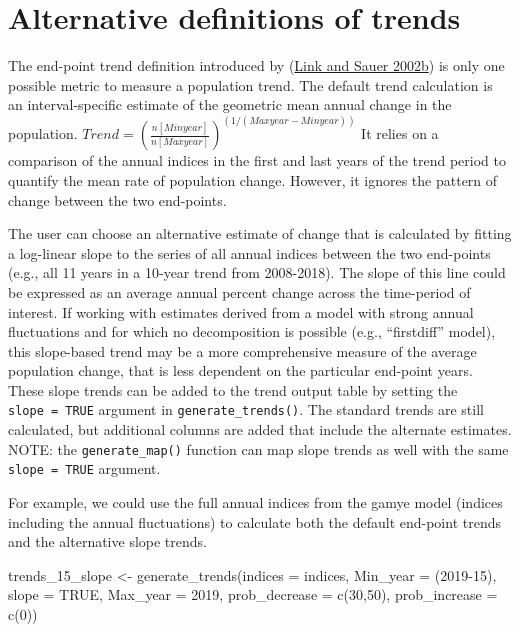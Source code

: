 \documentclass[
]{book}
\newenvironment{Shaded}{\begin{snugshade}}{\end{snugshade}}
\newcommand{\AttributeTok}[1]{\textcolor[rgb]{0.77,0.63,0.00}{#1}}
\newcommand{\ConstantTok}[1]{\textcolor[rgb]{0.00,0.00,0.00}{#1}}
\newcommand{\DecValTok}[1]{\textcolor[rgb]{0.00,0.00,0.81}{#1}}
\newcommand{\FunctionTok}[1]{\textcolor[rgb]{0.00,0.00,0.00}{#1}}
\newcommand{\NormalTok}[1]{#1}
\newcommand{\OtherTok}[1]{\textcolor[rgb]{0.56,0.35,0.01}{#1}}
\begin{document}
\hypertarget{alternative-definitions-of-trends}{%
\section{Alternative definitions of trends}\label{alternative-definitions-of-trends}}

The end-point trend definition introduced by (\protect\hyperlink{ref-link2002a}{Link and Sauer 2002b}) is only one possible metric to measure a population trend. The default trend calculation is an interval-specific estimate of the geometric mean annual change in the population. \(Trend = (\frac {n[Minyear]}{n[Maxyear]})^{(1/(Maxyear-Minyear))}\) It relies on a comparison of the annual indices in the first and last years of the trend period to quantify the mean rate of population change. However, it ignores the pattern of change between the two end-points.

The user can choose an alternative estimate of change that is calculated by fitting a log-linear slope to the series of all annual indices between the two end-points (e.g., all 11 years in a 10-year trend from 2008-2018). The slope of this line could be expressed as an average annual percent change across the time-period of interest. If working with estimates derived from a model with strong annual fluctuations and for which no decomposition is possible (e.g., ``firstdiff'' model), this slope-based trend may be a more comprehensive measure of the average population change, that is less dependent on the particular end-point years. These slope trends can be added to the trend output table by setting the \texttt{slope\ =\ TRUE} argument in \texttt{generate\_trends()}. The standard trends are still calculated, but additional columns are added that include the alternate estimates. NOTE: the \texttt{generate\_map()} function can map slope trends as well with the same \texttt{slope\ =\ TRUE} argument.

For example, we could use the full annual indices from the gamye model (indices including the annual fluctuations) to calculate both the default end-point trends and the alternative slope trends.

\begin{Shaded}
\begin{Highlighting}[]
\NormalTok{trends\_15\_slope }\OtherTok{\textless{}{-}} \FunctionTok{generate\_trends}\NormalTok{(}\AttributeTok{indices =}\NormalTok{ indices,}
                          \AttributeTok{Min\_year =}\NormalTok{ (}\DecValTok{2019{-}15}\NormalTok{),}
                          \AttributeTok{slope =} \ConstantTok{TRUE}\NormalTok{,}
                          \AttributeTok{Max\_year =} \DecValTok{2019}\NormalTok{,}
                          \AttributeTok{prob\_decrease =} \FunctionTok{c}\NormalTok{(}\DecValTok{30}\NormalTok{,}\DecValTok{50}\NormalTok{),}
                          \AttributeTok{prob\_increase =} \FunctionTok{c}\NormalTok{(}\DecValTok{0}\NormalTok{))}
\end{Highlighting}
\end{Shaded}
\end{document}

